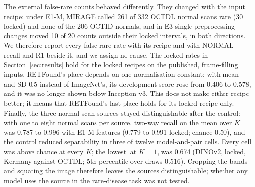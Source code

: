 \documentclass[conference]{IEEEtran}
\begin{document}
The external false-rare counts behaved differently. They changed with the input recipe: under E1-M, MIRAGE called 261 of 332 OCTDL normal scans rare (30 locked) and none of the 206 OCTID normals, and in E3 single preprocessing changes moved 10 of 20 counts outside their locked intervals, in both directions. We therefore report every false-rare rate with its recipe and with NORMAL recall and R1 beside it, and we assign no cause. The locked rates in Section~\ref{sec:results} hold for the locked recipes on the published, frame-filling inputs.
RETFound's place depends on one normalisation constant: with mean and SD 0.5 instead of ImageNet's, its development score rose from 0.406 to 0.578, and it was no longer shown below Inception-v3. This does not make either recipe better; it means that RETFound's last place holds for its locked recipe only.
Finally, the three normal-scan sources stayed distinguishable after the control: with one to eight normal scans per source, two-way recall on the mean over $K$ was 0.787 to 0.996 with E1-M features (0.779 to 0.991 locked; chance 0.50), and the control reduced separability in three of twelve model-and-pair cells. Every cell was above chance at every $K$; the lowest, at $K=1$, was 0.674 (DINOv2, locked, Kermany against OCTDL; 5th percentile over draws 0.516). Cropping the bands and squaring the image therefore leaves the sources distinguishable; whether any model uses the source in the rare-disease task was not tested.
\end{document}
